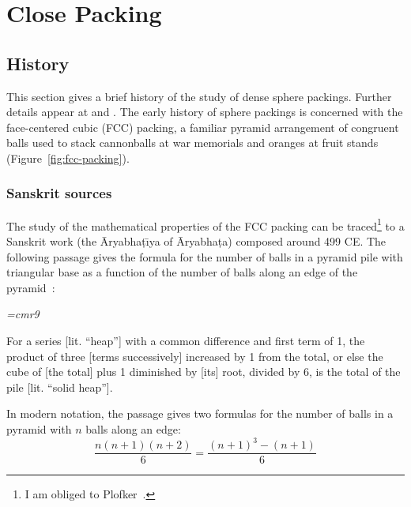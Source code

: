 

\chapter{Close Packing}

\section{History}\label{sec:history}

This section gives a brief history of the study of dense sphere
packings.  Further details appear at \cite{Szpiro} and
\cite{Hales:2006:overview}.
The early history of sphere packings is concerned with the
face-centered cubic (FCC) packing, a familiar pyramid arrangement
of congruent balls used to stack cannonballs at war memorials and
oranges at fruit stands (Figure~\ref{fig:fcc-packing}).

\figDHQRILO %


\subsection{Sanskrit sources}



The study of the mathematical properties of the FCC
packing can be traced\footnote{I am obliged to Plofker~\cite{Plo00}.} to a Sanskrit work (the \=Aryabha\d t\={\i}ya
 of \=Aryabha\d ta) composed around 499 CE.  The following passage gives
the formula for the number of balls in a pyramid pile with triangular base as
a function of the number of balls along an edge of the pyramid~\cite{Ary}:


\bigskip

{\narrower\it\font\ninerm=cmr9

For a series [lit. ``heap''] with a common difference and
  first term of 1, the product of three [terms successively] increased
  by 1 from the total, or else the cube of [the total] plus 1
  diminished by [its] root, divided by 6, is the total of the pile
  [lit. ``solid heap''].  

}

\bigskip

 In modern notation, the passage gives two formulas for the number of
 balls in a pyramid with $n$ balls along an edge:
\[
\dfrac{n(n+1)(n+2)}{6} =  \dfrac{(n+1)^3 - (n+1)}{6}
\]

